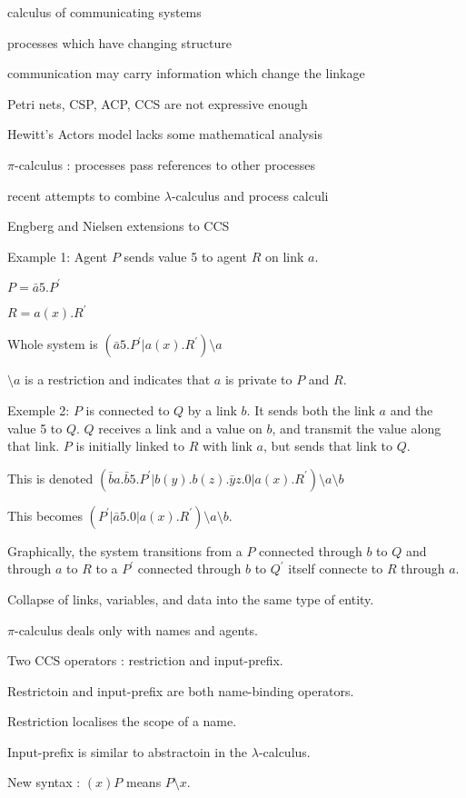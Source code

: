 \documentclass[a4paper]{article}
\begin{document}
calculus of communicating systems

processes which have changing structure

communication may carry information which change the linkage

Petri nets, CSP, ACP, CCS are not expressive enough

Hewitt's Actors model lacks some mathematical analysis

$\pi$-calculus : processes pass references to other processes

recent attempts to combine $\lambda$-calculus and process calculi

Engberg and Nielsen extensions to CCS

Example 1: Agent $P$ sends value 5 to agent $R$ on link $a$.

$P=\bar a5.P^\prime$

$R=a(x).R^\prime$

Whole system is $(\bar a5.P^\prime|a(x).R^\prime)\setminus a$

$\setminus a$ is a restriction and indicates that $a$ is private to $P$ and $R$.

Exemple 2: $P$ is connected to $Q$ by a link $b$. It sends both the link $a$ and the value 5 to $Q$. $Q$ receives a link and a value on $b$, and transmit the value along that link. $P$ is initially linked to $R$ with link $a$, but sends that link to $Q$.

This is denoted $(\bar ba.\bar b5.P^\prime|b(y).b(z).\bar yz.0|a(x).R^\prime)\setminus a\setminus b$

This becomes $(P^\prime|\bar a5.0|a(x).R^\prime)\setminus a\setminus b$.

Graphically, the system transitions from a $P$ connected through $b$ to $Q$ and through $a$ to $R$ to a $P^\prime$ connected through $b$ to $Q^\prime$ itself connecte to $R$ through $a$.

Collapse of links, variables, and data into the same type of entity.

$\pi$-calculus deals only with names and agents.

Two CCS operators : restriction and input-prefix.

Restrictoin and input-prefix are both name-binding operators.

Restriction localises the scope of a name.

Input-prefix is similar to abstractoin in the $\lambda$-calculus.

New syntax : $(x)P$ means $P\setminus x$.
\end{document}
